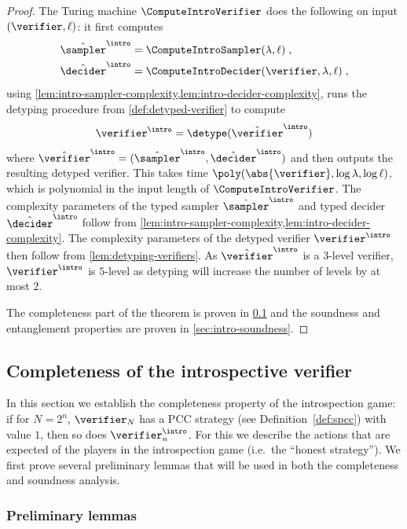 \begin{proof}
  The Turing machine $\ComputeIntroVerifier$ does the following on input
  $(\verifier, \ell)$: it first computes
  \begin{align*}
    \tsint & = \ComputeIntroSampler(\lambda,\ell)\;,\\
    \tdint & = \ComputeIntroDecider(\verifier, \lambda, \ell)\;,
  \end{align*}
  using \cref{lem:intro-sampler-complexity,lem:intro-decider-complexity}, runs
  the detyping procedure from \cref{def:detyped-verifier} to compute
  \begin{equation*}
    \vint = \detype(\tvint)
  \end{equation*}
  where $\tvint = (\tsint,\tdint)$ and then outputs the resulting detyped verifier.
  This takes time $\poly(\abs{\verifier}, \log\lambda, \log\ell)$, which is polynomial
  in the input length of $\ComputeIntroVerifier$. 
  The complexity parameters of the typed sampler $\tsint$ and typed decider
  $\tdint$ follow from
  \cref{lem:intro-sampler-complexity,lem:intro-decider-complexity}.
  The complexity parameters of the detyped verifier $\vint$ then follow from
  \cref{lem:detyping-verifiers}.
  As $\tvint$ is a $3$-level verifier, $\vint$ is $5$-level as detyping will
  increase the number of levels by at most $2$.

  The completeness part of the theorem is proven in \cref{sec:intro-completeness} and
  the soundness and entanglement properties are proven in \cref{sec:intro-soundness}.
\end{proof}


\subsection{Completeness of the introspective verifier}
\label{sec:intro-completeness}

In this section we establish the completeness property of the introspection
game: if for $N = 2^n$, $\verifier_N$ has a PCC strategy (see
Definition~\ref{def:spcc}) with value $1$, then so does $\vint_n$.
For this we describe the actions that are expected of the players in the
introspection game (i.e.\ the ``honest strategy'').
We first prove several preliminary lemmas that will be used in both the
completeness and soundness analysis.

\subsubsection{Preliminary lemmas}

